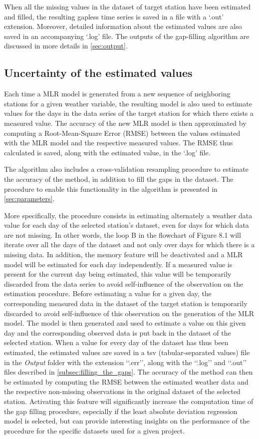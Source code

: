 \documentclass[TechnicalNoteMeteo.tex]{subfiles}
\begin{document}
When all the missing values in the dataset of target station have been estimated and filled, the resulting gapless time series is saved in a file with a `.out' extension. Moreover, detailed information about the estimated values are also saved in an accompanying `.log' file. The outputs of the gap-filling algorithm are discussed in more details in \cref{sec:output}.

\subsection{Uncertainty of the estimated values}

Each time a MLR model is generated from a new sequence of neighboring stations for a given weather variable, the resulting model is also used to estimate values for the days in the data series of the target station for which there exists a measured value. The accuracy of the new MLR model is then approximated by computing a Root-Mean-Square Error (RMSE) between the values estimated with the MLR model and the respective measured values. The RMSE thus calculated is saved, along with the estimated value, in the `.log' file.

The algorithm also includes a cross-validation resampling procedure to estimate the accuracy of the method, in addition to fill the gaps in the dataset. The procedure to enable this functionality in the algorithm is presented in \cref{sec:parameters}.

More specifically, the procedure consists in estimating alternately a weather data value for each day of the selected station's dataset, even for days for which data are not missing. In other words, the loop B in the flowchart of Figure 8.1 will iterate over all the days of the dataset and not only over days for which there is a missing data. In addition, the memory feature will be deactivated and a MLR model will be estimated for each day independently. If a measured value is present for the current day being estimated, this value will be temporarily discarded from the data series to avoid self-influence of the observation on the estimation procedure. Before estimating a value for a given day, the corresponding measured data in the dataset of the target station is temporarily discarded to avoid self-influence of this observation on the generation of the MLR model. The model is then generated and used to estimate a value on this given day and the corresponding observed data is put back in the dataset of the selected station. When a value for every day of the dataset has thus been estimated, the estimated values are saved in a tsv (tabular-separated values) file in the \emph{Output} folder with the extension ‘‘.err’’, along with the ‘‘.log’’ and ‘‘.out’’ files described in \cref{subsec:filling_the_gaps}. The accuracy of the method can then be estimated by computing the RMSE between the estimated weather data and the respective non-missing observations in the original dataset of the selected station. Activating this feature will significantly increase the computation time of the gap filling procedure, especially if the least absolute deviation regression model is selected, but can provide interesting insights on the performance of the procedure for the specific datasets used for a given project.
\end{document}
